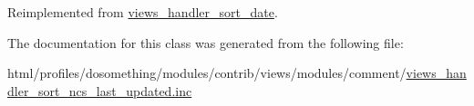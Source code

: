 Reimplemented from \hyperlink{classviews__handler__sort__date_a3d3680d96fee82a746bac50c051016a8}{views\_\-handler\_\-sort\_\-date}.

The documentation for this class was generated from the following file:\begin{DoxyCompactItemize}
\item 
html/profiles/dosomething/modules/contrib/views/modules/comment/\hyperlink{views__handler__sort__ncs__last__updated_8inc}{views\_\-handler\_\-sort\_\-ncs\_\-last\_\-updated.inc}\end{DoxyCompactItemize}
